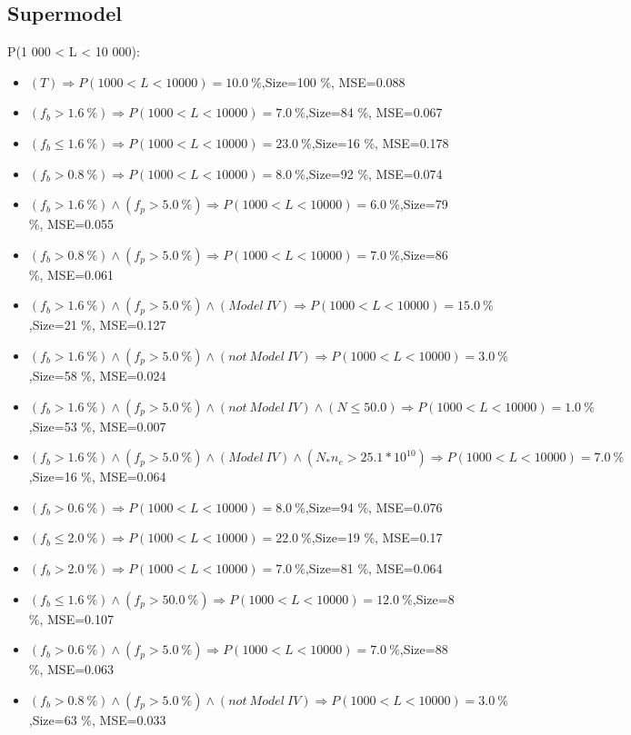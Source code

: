\documentclass[numbered]{CSL}
\begin{document}
\subsection{Supermodel}
P(1 000 < L < 10 000):
\begin{itemize}
\item $(T) \Rightarrow P(1 000 < L < 10 000) = 10.0~\%$,\hfill Size=100 \%, MSE=0.088
\item $(f_b > 1.6~\%) \Rightarrow P(1 000 < L < 10 000) = 7.0~\%$,\hfill Size=84 \%, MSE=0.067
\item $(f_b \leq 1.6~\%) \Rightarrow P(1 000 < L < 10 000) = 23.0~\%$,\hfill Size=16 \%, MSE=0.178
\item $(f_b > 0.8~\%) \Rightarrow P(1 000 < L < 10 000) = 8.0~\%$,\hfill Size=92 \%, MSE=0.074
\item $(f_b > 1.6~\%) \land (f_p > 5.0~\%) \Rightarrow P(1 000 < L < 10 000) = 6.0~\%$,\hfill Size=79 \%, MSE=0.055
\item $(f_b > 0.8~\%) \land (f_p > 5.0~\%) \Rightarrow P(1 000 < L < 10 000) = 7.0~\%$,\hfill Size=86 \%, MSE=0.061
\item $(f_b > 1.6~\%) \land (f_p > 5.0~\%) \land (Model~IV) \Rightarrow P(1 000 < L < 10 000) = 15.0~\%$,\hfill Size=21 \%, MSE=0.127
\item $(f_b > 1.6~\%) \land (f_p > 5.0~\%) \land (not~Model~IV) \Rightarrow P(1 000 < L < 10 000) = 3.0~\%$,\hfill Size=58 \%, MSE=0.024
\item $(f_b > 1.6~\%) \land (f_p > 5.0~\%) \land (not~Model~IV) \land (N \leq 50.0) \Rightarrow P(1 000 < L < 10 000) = 1.0~\%$,\hfill Size=53 \%, MSE=0.007
\item $(f_b > 1.6~\%) \land (f_p > 5.0~\%) \land (Model~IV) \land (N_* n_e > 25.1 * 10^{10}) \Rightarrow P(1 000 < L < 10 000) = 7.0~\%$,\hfill Size=16 \%, MSE=0.064
\item $(f_b > 0.6~\%) \Rightarrow P(1 000 < L < 10 000) = 8.0~\%$,\hfill Size=94 \%, MSE=0.076
\item $(f_b \leq 2.0~\%) \Rightarrow P(1 000 < L < 10 000) = 22.0~\%$,\hfill Size=19 \%, MSE=0.17
\item $(f_b > 2.0~\%) \Rightarrow P(1 000 < L < 10 000) = 7.0~\%$,\hfill Size=81 \%, MSE=0.064
\item $(f_b \leq 1.6~\%) \land (f_p > 50.0~\%) \Rightarrow P(1 000 < L < 10 000) = 12.0~\%$,\hfill Size=8 \%, MSE=0.107
\item $(f_b > 0.6~\%) \land (f_p > 5.0~\%) \Rightarrow P(1 000 < L < 10 000) = 7.0~\%$,\hfill Size=88 \%, MSE=0.063
\item $(f_b > 0.8~\%) \land (f_p > 5.0~\%) \land (not~Model~IV) \Rightarrow P(1 000 < L < 10 000) = 3.0~\%$,\hfill Size=63 \%, MSE=0.033

\end{itemize}
\end{document}
